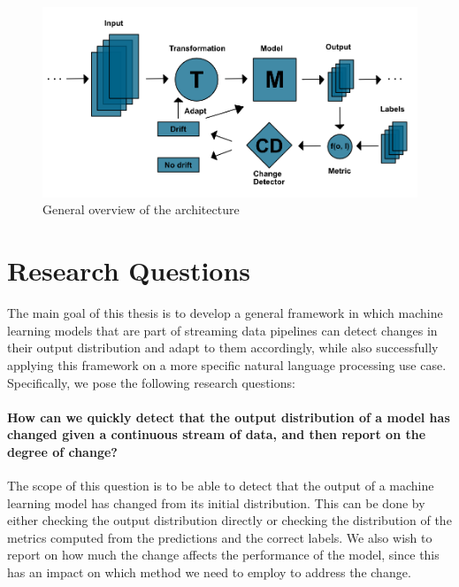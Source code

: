 \documentclass[12pt]{extreport}
\begin{document}
\begin{figure}[ht!]
\centering
\includegraphics[width=\linewidth]{assets/introduction/framework.png}
\caption{General overview of the architecture}
\label{fig:framework}
\end{figure}

\section{Research Questions}

The main goal of this thesis is to develop a general framework in which machine learning models that are part of streaming data pipelines can detect changes in their output distribution and adapt to them accordingly, while also successfully applying this framework on a more specific natural language processing use case. Specifically, we pose the following research questions:

\paragraph*{How can we quickly detect that the output distribution of a model has changed given a continuous stream of data, and then report on the degree of change?} The scope of this question is to be able to detect that the output of a machine learning model has changed from its initial distribution. This can be done by either checking the output distribution directly or checking the distribution of the metrics computed from the predictions and the correct labels. We also wish to report on how much the change affects the performance of the model, since this has an impact on which method we need to employ to address the change.
\end{document}
